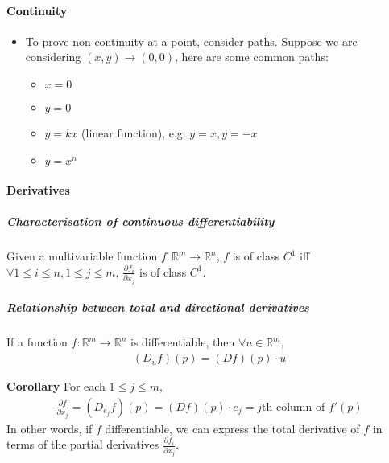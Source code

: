 \documentclass{article}
\begin{document}
\paragraph{Continuity}
\begin{itemize}
	\item To prove non-continuity at a point, consider paths. Suppose we are considering $(x,y)\rightarrow (0,0)$, here are some common paths:
	\begin{itemize}
		\item $x=0$
		\item $y=0$
		\item $y=kx$ (linear function), e.g. $y=x, y=-x$
		\item $y=x^n$
	\end{itemize}
\end{itemize}
\paragraph{Derivatives}
\subparagraph{Characterisation of continuous differentiability} Given a multivariable function $f:\mathbb{R}^m\rightarrow \mathbb{R}^n$, $f$ is of class $C^1$ iff  $\forall 1\leq i\leq n, 1\leq j\leq m,\, \frac{\partial f_i}{\partial x_j}$ is of class $C^1$.
\subparagraph{Relationship between total and directional derivatives} If a function $f:\mathbb{R}^m\rightarrow \mathbb{R}^n$ is differentiable, then $\forall u\in \mathbb{R}^m$, 
\begin{align*}
	(D_uf)(p)=(Df)(p)\cdot u
\end{align*}

\textbf{Corollary} For each $1\leq j\leq m$,  
\begin{align*}
	\frac{\partial f}{\partial x_j}=(D_{e_j}f)(p)=(Df)(p)\cdot e_j =j\text{th column of } f'(p)
\end{align*}
In other words, if $f$ differentiable, we can express the total derivative of $f$ in terms of the partial derivatives $\frac{\partial f_i}{\partial x_j}$.
\end{document}
